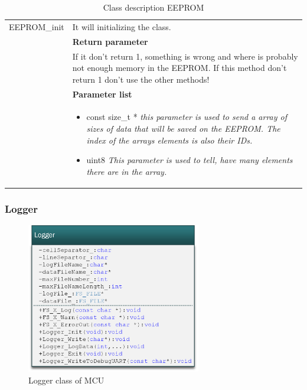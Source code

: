 \begin{table}[H]
\begin{tabular}{|p{5 cm}|p{10 cm}|}
		EEPROM\_init
		& It will initializing the class.
		\\ & \textbf{Return parameter}
		\\ & If it don't return 1, something is wrong and where is probably not enough memory in the EEPROM. If this method don't return 1 don't use the other methods!   
		\\ & \textbf{Parameter list}
		\\ & \begin{itemize}
			\item {\large const size\_t *}
			\subitem \textit{this parameter is used to send a array of sizes of data that will be saved on the EEPROM. The index of the arrays elements is also their IDs.}
			\item {\large uint8}
			\subitem \textit{This parameter is used to tell, have many elements there are in the array.}
		\end{itemize}
		\\ \hline
		
	\end{tabular}
	\caption{Class description EEPROM}
	\label{table:Class_description_EEPROM}
\end{table}

\subsubsection{Logger}

\begin{figure}[H]
	\centering
	\includegraphics [width=3in]{Software/Pictures/class-diagram-logger.png}
	\caption{Logger class of MCU}
	\label{fig:Class_diagram_MCU_logger}
\end{figure}

